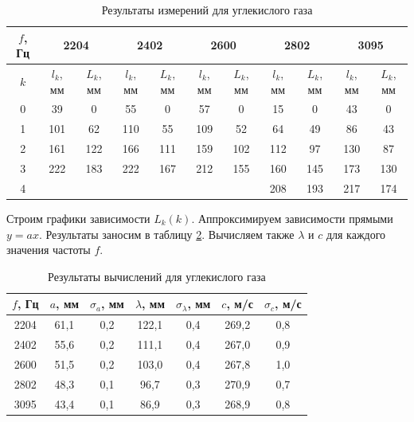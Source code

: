 \documentclass[a4paper,12pt]{article} %
\begin{document}
\begin{table}[H]
	\centering
	\begin{tabular}{|c|c|c|c|c|c|c|c|c|c|c|}
		\hline
		$ f $, Гц & \multicolumn{2}{c|}{\textbf{2204}} & \multicolumn{2}{c|}{\textbf{2402}} & \multicolumn{2}{c|}{\textbf{2600}} & \multicolumn{2}{c|}{\textbf{2802}} & \multicolumn{2}{c|}{\textbf{3095}} \\ \hline
		$ k $ & $ l_k $, мм & $ L_k $, мм & $ l_k $, мм & $ L_k $, мм & $ l_k $, мм & $ L_k $, мм & $ l_k $, мм & $ L_k $, мм & $ l_k $, мм & $ L_k $, мм \\ \hline
		0 & 39 & 0 & 55 & 0 & 57 & 0 & 15 & 0 & 43 & 0 \\ \hline
		1 & 101 & 62 & 110 & 55 & 109 & 52 & 64 & 49 & 86 & 43 \\ \hline
		2 & 161 & 122 & 166 & 111 & 159 & 102 & 112 & 97 & 130 & 87 \\ \hline
		3 & 222 & 183 & 222 & 167 & 212 & 155 & 160 & 145 & 173 & 130 \\ \hline
		4 &  &  &  &  &  &  & 208 & 193 & 217 & 174 \\ \hline
	\end{tabular}
	\caption{Результаты измерений для углекислого газа}
	\label{tab:CO2}
\end{table}

Строим графики зависимости $ L_k(k) $. Аппроксимируем зависимости прямыми $ y=ax $. Результаты заносим в таблицу \ref{tab:resCO2}. Вычисляем также $ \lambda $ и $ c $ для каждого значения частоты $ f $.

\begin{table}[H]
	\centering
	\begin{tabular}{|c|c|c|c|c|c|c|}
		\hline
		$ f $, Гц & $ a $, мм & $ \sigma_a $, мм & $ \lambda $, мм & $ \sigma_\lambda $, мм & $ c $, м/с & $ \sigma_c $, м/с \\ \hline
		2204 & 61,1 & 0,2 & 122,1 & 0,4 & 269,2 & 0,8 \\ \hline
		2402 & 55,6 & 0,2 & 111,1 & 0,4 & 267,0 & 0,9 \\ \hline
		2600 & 51,5 & 0,2 & 103,0 & 0,4 & 267,8 & 1,0 \\ \hline
		2802 & 48,3 & 0,1 & 96,7 & 0,3 & 270,9 & 0,7 \\ \hline
		3095 & 43,4 & 0,1 & 86,9 & 0,3 & 268,9 & 0,8 \\ \hline
	\end{tabular}
	\caption{Результаты вычислений для углекислого газа}
	\label{tab:resCO2}
\end{table}
\end{document}
